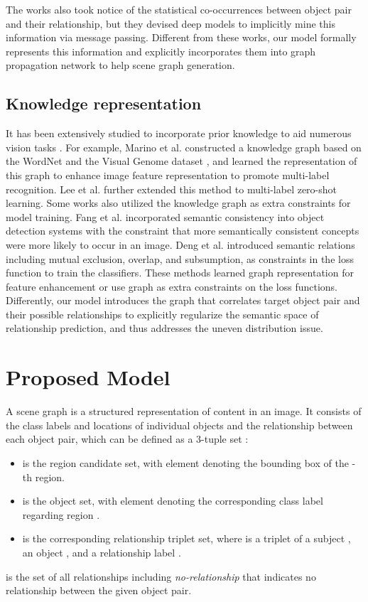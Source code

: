 \documentclass[10pt,twocolumn,letterpaper]{article}
\begin{document}
The works \cite{dai2017detecting,zellers2017neural} also took notice of the statistical co-occurrences between object pair and their relationship, but they devised deep models to implicitly mine this information via message passing. Different from these works, our model formally represents this information and explicitly incorporates them into graph propagation network to help scene graph generation. 

\subsection{Knowledge representation}
It has been extensively studied to incorporate prior knowledge to aid numerous vision tasks \cite{marino2017more,fang2017object,lee2017multi,deng2014large,chen2018neural,lin2017knowledge}. For example, Marino et al. \cite{marino2017more} constructed a knowledge graph based on the WordNet \cite{miller1995wordnet} and the Visual Genome dataset \cite{krishna2017visual}, and learned the representation of this graph to enhance image feature representation to promote multi-label recognition. Lee et al. \cite{lee2017multi} further extended this method to multi-label zero-shot learning. Some works also utilized the knowledge graph as extra constraints for model training. Fang et al. \cite{fang2017object} incorporated semantic consistency into object detection systems with the constraint that more semantically consistent concepts were more likely to occur in an image. Deng et al. \cite{deng2014large} introduced semantic relations including mutual exclusion, overlap, and subsumption, as constraints in the loss function to train the classifiers. These methods learned graph representation for feature enhancement or use graph as extra constraints on the loss functions. Differently, our model introduces the graph that correlates target object pair and their possible relationships to explicitly regularize the semantic space of relationship prediction, and thus addresses the uneven distribution issue.

\section{Proposed Model}
A scene graph is a structured representation of content in an image. It consists of the class labels and locations of individual objects and the relationship between each object pair, which can be defined as a 3-tuple set :
\begin{itemize}
  \item  is the region candidate set, with element  denoting the bounding box of the -th region.  
  \item  is the object set, with element  denoting the corresponding class label regarding region . 
  \item  is the corresponding relationship triplet set, where  is a triplet of a subject , an object , and a relationship label .
\end{itemize}
 is the set of all relationships including \emph{no-relationship} that indicates no relationship between the given object pair.
\end{document}
